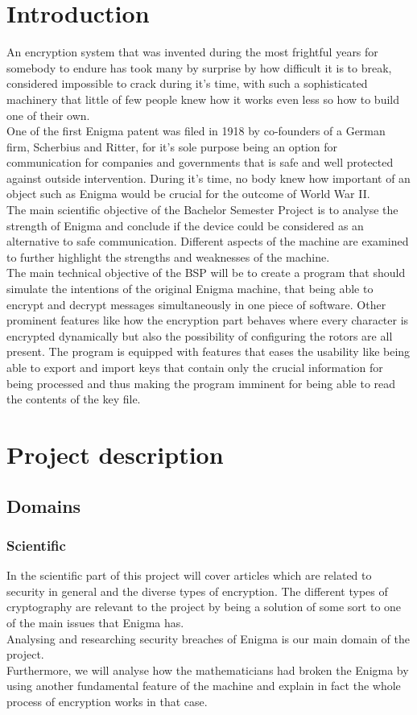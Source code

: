 \documentclass[conference,compsoc]{IEEEtran}
\begin{document}
\section{Introduction}
An encryption system that was invented during the most frightful years for somebody to endure has took many by surprise by how difficult it is to break, considered impossible to crack during it's time, with such a sophisticated machinery that little of few people knew how it works even less so how to build one of their own.\\
One of the first Enigma patent was filed in 1918 by co-founders of a German firm, Scherbius and Ritter, for it's sole purpose being an option for communication for companies and governments that is safe and well protected against outside intervention. During it's time, no body knew how important of an object such as Enigma would be crucial for the outcome of World War II.\\
The main scientific objective of the Bachelor Semester Project is to analyse the strength of Enigma and conclude if the device could be considered as an alternative to safe communication. Different aspects of the machine are examined to further highlight the strengths and weaknesses of the machine.\\
The main technical objective of the BSP will be to create a program that should simulate the intentions of the original Enigma machine, that being able to encrypt and decrypt messages simultaneously in one piece of software.
Other prominent features like how the encryption part behaves where every character is encrypted dynamically but also the possibility of configuring the rotors are all present. The program is equipped with features that eases the usability like being able to export and import keys that contain only the crucial information for being processed and thus making the program imminent for being able to read the contents of the key file.\\


\section{Project description}
\subsection{Domains}
\subsubsection{Scientific }
In the scientific part of this project will cover articles which are related to security in general and the diverse types of encryption. The different types of cryptography are relevant to the project by being a solution of some sort to one of the main issues that Enigma has.\\
Analysing and researching security breaches of Enigma is our main domain of the project.\\
Furthermore, we will analyse how the mathematicians had broken the Enigma by using another fundamental feature of the machine and explain in fact the whole process of encryption works in that case.\\
\end{document}

